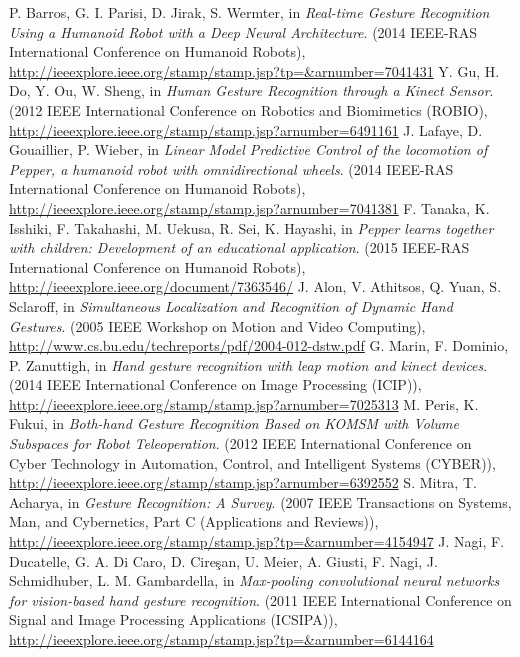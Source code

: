 %
%
% 
% 
%


\begin{thebibliography}{99.}%

 P. Barros, G. I. Parisi, D. Jirak, S. Wermter, in \textit{Real-time Gesture Recognition Using a Humanoid Robot with a Deep Neural Architecture}. (2014 IEEE-RAS International Conference on Humanoid Robots), 
\url{http://ieeexplore.ieee.org/stamp/stamp.jsp?tp=\&arnumber=7041431}
 Y. Gu, H. Do, Y. Ou, W. Sheng, in \textit{Human Gesture Recognition through a Kinect Sensor}. (2012 IEEE International Conference on Robotics and Biomimetics (ROBIO), 
\url{http://ieeexplore.ieee.org/stamp/stamp.jsp?arnumber=6491161}
 J. Lafaye, D. Gouaillier, P. Wieber, in \textit{Linear Model Predictive Control of the locomotion of Pepper, a humanoid robot with omnidirectional wheels}. (2014 IEEE-RAS International Conference on Humanoid Robots), 
\url{http://ieeexplore.ieee.org/stamp/stamp.jsp?arnumber=7041381}
 F. Tanaka, K. Isshiki, F. Takahashi, M. Uekusa, R. Sei, K. Hayashi, in \textit{Pepper learns together with children: Development of an educational application}. (2015 IEEE-RAS International Conference on Humanoid Robots), 
\url{http://ieeexplore.ieee.org/document/7363546/}
 J. Alon, V. Athitsos, Q. Yuan, S. Sclaroff, in \textit{Simultaneous Localization and Recognition of Dynamic Hand Gestures}. (2005 IEEE Workshop on Motion and Video Computing), 
\url{http://www.cs.bu.edu/techreports/pdf/2004-012-dstw.pdf}
 G. Marin, F. Dominio, P. Zanuttigh, in \textit{Hand gesture recognition with leap motion and kinect devices}. (2014 IEEE International Conference on Image Processing (ICIP)),
\url{http://ieeexplore.ieee.org/stamp/stamp.jsp?arnumber=7025313}
 M. Peris, K. Fukui, in \textit{Both-hand Gesture Recognition Based on KOMSM with Volume Subspaces for Robot Teleoperation}. (2012 IEEE International Conference on Cyber Technology in Automation, Control, and Intelligent Systems (CYBER)), 
\url{http://ieeexplore.ieee.org/stamp/stamp.jsp?arnumber=6392552}
 S. Mitra, T. Acharya, in \textit{Gesture Recognition: A Survey}. (2007 IEEE Transactions on Systems, Man, and Cybernetics, Part C (Applications and Reviews)), 
\url{http://ieeexplore.ieee.org/stamp/stamp.jsp?tp=\&arnumber=4154947}
J. Nagi, F. Ducatelle, G. A. Di Caro, D. Cireşan, U. Meier, A. Giusti, F. Nagi, J. Schmidhuber, L. M. Gambardella, in \textit{Max-pooling convolutional neural networks for vision-based hand gesture recognition}. (2011 IEEE International Conference on Signal and Image Processing Applications (ICSIPA)), 
\url{http://ieeexplore.ieee.org/stamp/stamp.jsp?tp=\&arnumber=6144164}
\end{thebibliography}